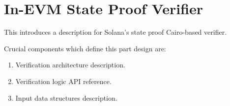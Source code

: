 \chapter{In-EVM State Proof Verifier}

This introduces a description for Solana's state proof Cairo-based verifier.

Crucial components which define this part design are:
\begin{enumerate}
    \item Verification architecture description.
    \item Verification logic API reference.
    \item Input data structures description.
\end{enumerate}




